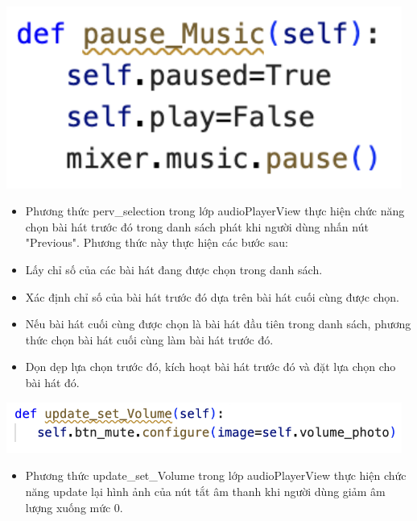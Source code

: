 \documentclass[a4paper]{article}
\begin{document}
\begin{center}
\includegraphics[width=130mm]{template_SGU 2/audio_pause.png}
\end{center}
\begin{itemize}
    \item Phương thức perv\_selection trong lớp audioPlayerView thực hiện chức năng chọn bài hát trước đó trong danh sách phát khi người dùng nhấn nút "Previous". Phương thức này thực hiện các bước sau:
    \item Lấy chỉ số của các bài hát đang được chọn trong danh sách.
    \item Xác định chỉ số của bài hát trước đó dựa trên bài hát cuối cùng được chọn.
    \item Nếu bài hát cuối cùng được chọn là bài hát đầu tiên trong danh sách, phương thức chọn bài hát cuối cùng làm bài hát trước đó.
    \item Dọn dẹp lựa chọn trước đó, kích hoạt bài hát trước đó và đặt lựa chọn cho bài hát đó.
\end{itemize}

\begin{center}
\includegraphics[width=130mm]{template_SGU 2/audio_updatesetVolume.png}
\end{center}
\begin{itemize}
    \item Phương thức update\_set\_Volume trong lớp audioPlayerView thực hiện chức năng update lại hình ảnh của nút tắt âm thanh khi người dùng giảm âm lượng xuống mức 0.
\end{itemize}
\end{document}
